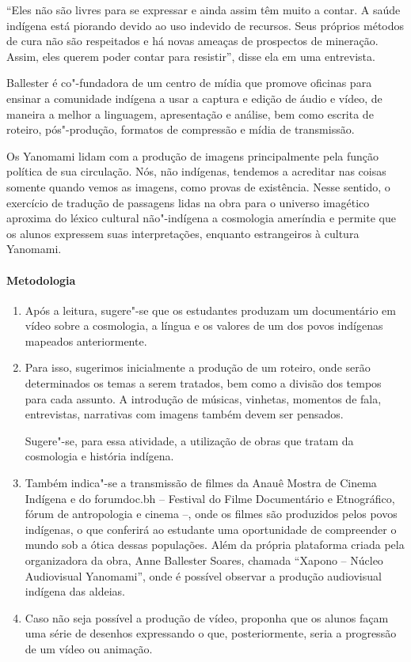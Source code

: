 \documentclass[12pt]{extarticle}
\begin{document}
``Eles não são livres para se expressar e ainda assim têm muito a contar. A saúde indígena está 
piorando devido ao uso indevido de recursos. Seus próprios métodos de cura não são respeitados e 
há novas ameaças de prospectos de mineração. Assim, eles querem poder contar para resistir'', disse 
ela em uma entrevista.

Ballester é co"-fundadora de um centro de mídia que promove oficinas para ensinar a comunidade indígena a 
usar a captura e edição de áudio e vídeo, de maneira a melhor a linguagem, apresentação e análise, 
bem como escrita de roteiro, pós"-produção, formatos de compressão e mídia de transmissão.

Os Yanomami lidam com a produção de imagens principalmente pela função política de sua circulação.
Nós, não indígenas, tendemos a acreditar nas coisas somente quando vemos as imagens, como provas de 
existência. Nesse sentido, o exercício de tradução de passagens lidas na obra para o universo imagético 
aproxima do léxico cultural não"-indígena a cosmologia ameríndia e permite que os alunos expressem
suas interpretações, enquanto estrangeiros à cultura Yanomami. 

\paragraph{Metodologia}

\begin{enumerate}
\item Após a leitura, sugere"-se que os estudantes produzam um
documentário em vídeo sobre a cosmologia, a língua e os valores de um dos
povos indígenas mapeados anteriormente. 

\item Para isso, sugerimos inicialmente a produção de um roteiro, onde serão 
determinados os temas a serem tratados, bem como a divisão dos 
tempos para cada assunto. A introdução de músicas, vinhetas, momentos de fala,
entrevistas, narrativas com imagens também devem ser pensados.

Sugere"-se, para essa atividade, a utilização de obras que tratam da
cosmologia e história indígena. 

\item Também indica"-se a transmissão de filmes
da Anauê Mostra de Cinema Indígena e do forumdoc.bh – Festival do Filme 
Documentário e Etnográfico, fórum de antropologia e cinema –, onde os filmes
são produzidos pelos povos indígenas, o que conferirá ao estudante uma 
oportunidade de compreender o mundo sob a ótica dessas populações. Além da própria 
plataforma criada pela organizadora da obra, Anne Ballester Soares, chamada 
``Xapono -- Núcleo Audiovisual Yanomami'', onde é possível observar a produção 
audiovisual indígena das aldeias. 

\item Caso não seja possível a produção de vídeo, proponha que os alunos façam 
uma série de desenhos expressando o que, posteriormente, seria a progressão 
de um vídeo ou animação.
\end{enumerate}
\end{document}
